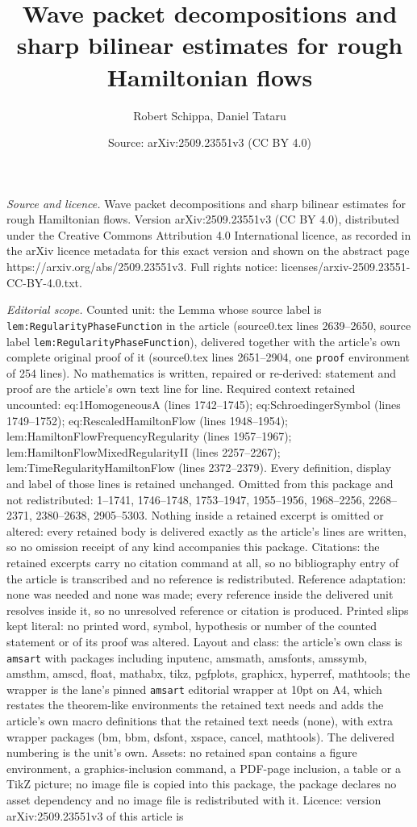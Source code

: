 \documentclass[10pt,a4paper]{amsart}
\title[Wave packet decompositions and sharp bilinear estimates for ]{Wave packet decompositions and sharp bilinear estimates for rough Hamiltonian flows}
\author{Robert Schippa, Daniel Tataru}
\date{Source: arXiv:2509.23551v3 (CC BY 4.0)}
\begin{document}
\maketitle

\noindent\emph{Source and licence.} Wave packet decompositions and sharp bilinear estimates for rough Hamiltonian flows. Version arXiv:2509.23551v3 (CC BY 4.0), distributed under the Creative Commons Attribution 4.0 International licence, as recorded in the arXiv licence metadata for this exact version and shown on the abstract page https://arxiv.org/abs/2509.23551v3. Full rights notice: licenses/arxiv-2509.23551-CC-BY-4.0.txt.\par\smallskip

\noindent\textit{Editorial scope.} Counted unit: the Lemma whose source label is \texttt{lem:RegularityPhaseFunction} in the article (source0.tex lines 2639--2650, source label \texttt{lem:RegularityPhaseFunction}), delivered together with the article's own complete original proof of it (source0.tex lines 2651--2904, one \texttt{proof} environment of 254 lines). No mathematics is written, repaired or re-derived: statement and proof are the article's own text line for line. Required context retained uncounted: eq:1HomogeneousA (lines 1742--1745); eq:SchroedingerSymbol (lines 1749--1752); eq:RescaledHamiltonFlow (lines 1948--1954); lem:HamiltonFlowFrequencyRegularity (lines 1957--1967); lem:HamiltonFlowMixedRegularityII (lines 2257--2267); lem:TimeRegularityHamiltonFlow (lines 2372--2379). Every definition, display and label of those lines is retained unchanged. Omitted from this package and not redistributed: 1--1741, 1746--1748, 1753--1947, 1955--1956, 1968--2256, 2268--2371, 2380--2638, 2905--5303. Nothing inside a retained excerpt is omitted or altered: every retained body is delivered exactly as the article's lines are written, so no omission receipt of any kind accompanies this package. Citations: the retained excerpts carry no citation command at all, so no bibliography entry of the article is transcribed and no reference is redistributed. Reference adaptation: none was needed and none was made; every reference inside the delivered unit resolves inside it, so no unresolved reference or citation is produced. Printed slips kept literal: no printed word, symbol, hypothesis or number of the counted statement or of its proof was altered. Layout and class: the article's own class is \texttt{amsart} with packages including inputenc, amsmath, amsfonts, amssymb, amsthm, amscd, float, mathabx, tikz, pgfplots, graphicx, hyperref, mathtools; the wrapper is the lane's pinned \texttt{amsart} editorial wrapper at 10pt on A4, which restates the theorem-like environments the retained text needs and adds the article's own macro definitions that the retained text needs (none), with extra wrapper packages (bm, bbm, dsfont, xspace, cancel, mathtools). The delivered numbering is the unit's own. Assets: no retained span contains a figure environment, a graphics-inclusion command, a PDF-page inclusion, a table or a TikZ picture; no image file is copied into this package, the package declares no asset dependency and no image file is redistributed with it. Licence: version arXiv:2509.23551v3 of this article is 
\end{document}
